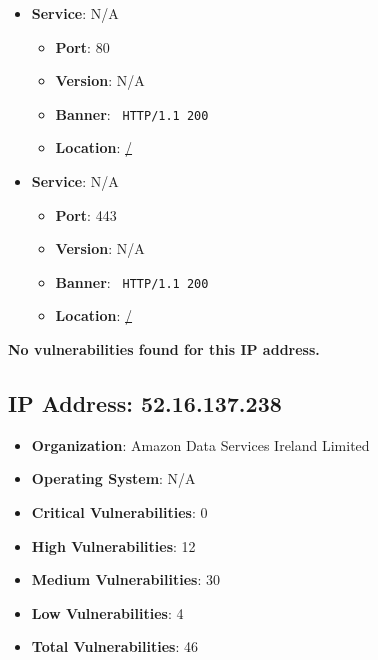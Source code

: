 \documentclass{article}
\begin{document}
\begin{itemize}
    
        \item \textbf{Service}: N/A
        \begin{itemize}
            \item \textbf{Port}: 80
            \item \textbf{Version}:  N/A 
            \item \textbf{Banner}: \texttt{
                HTTP/1.1 200 
            }
            \item \textbf{Location}: \href{ / }{ / }
        \end{itemize}
    
        \item \textbf{Service}: N/A
        \begin{itemize}
            \item \textbf{Port}: 443
            \item \textbf{Version}:  N/A 
            \item \textbf{Banner}: \texttt{
                HTTP/1.1 200 
            }
            \item \textbf{Location}: \href{ / }{ / }
        \end{itemize}
    
\end{itemize}


\textbf{No vulnerabilities found for this IP address.}




\clearpage



\subsection*{IP Address: 52.16.137.238}

\begin{itemize}
    \item \textbf{Organization}: Amazon Data Services Ireland Limited
    \item \textbf{Operating System}:  N/A 
    \item \textbf{Critical Vulnerabilities}: 0
    \item \textbf{High Vulnerabilities}: 12
    \item \textbf{Medium Vulnerabilities}: 30
    \item \textbf{Low Vulnerabilities}: 4
    \item \textbf{Total Vulnerabilities}: 46
\end{itemize}
\end{document}
